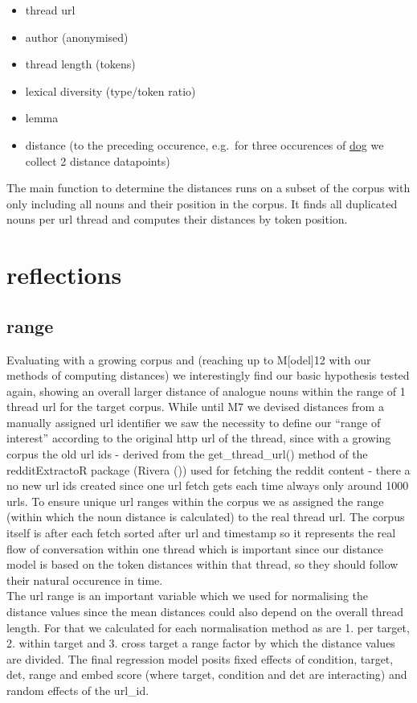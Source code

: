 \documentclass[
  12pt,
  oneside]{book}
\providecommand{\tightlist}{%
  \setlength{\itemsep}{0pt}\setlength{\parskip}{0pt}}
\begin{document}
\begin{itemize}
\tightlist
\item
  thread url
\item
  author (anonymised)
\item
  thread length (tokens)
\item
  lexical diversity (type/token ratio)
\item
  lemma
\item
  distance (to the preceding occurence, e.g.~for three occurences of \href{}{dog} we collect 2 distance datapoints)
\end{itemize}

The main function to determine the distances runs on a subset of the corpus with only including all nouns and their position in the corpus. It finds all duplicated nouns per url thread and computes their distances by token position.

\section{reflections}\label{reflections}

\subsection{range}\label{range}

Evaluating with a growing corpus and (reaching up to M{[}odel{]}12 with our methods of computing distances) we interestingly find our basic hypothesis tested again, showing an overall larger distance of analogue nouns within the range of 1 thread url for the target corpus. While until M7 we devised distances from a manually assigned url identifier we saw the necessity to define our ``range of interest'' according to the original http url of the thread, since with a growing corpus the old url ids - derived from the get\_thread\_url() method of the redditExtractoR package (Rivera ()) used for fetching the reddit content - there a no new url ids created since one url fetch gets each time always only around 1000 urls. To ensure unique url ranges within the corpus we as assigned the range (within which the noun distance is calculated) to the real thread url. The corpus itself is after each fetch sorted after url and timestamp so it represents the real flow of conversation within one thread which is important since our distance model is based on the token distances within that thread, so they should follow their natural occurence in time.\\
The url range is an important variable which we used for normalising the distance values since the mean distances could also depend on the overall thread length. For that we calculated for each normalisation method as are 1. per target, 2. within target and 3. cross target a range factor by which the distance values are divided. The final regression model posits fixed effects of condition, target, det, range and embed score (where target, condition and det are interacting) and random effects of the url\_id.
\end{document}
